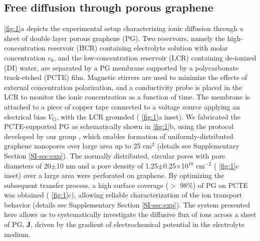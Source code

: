 \subsection{Free diffusion through porous graphene}
\label{sec:res-1}

\Fig{} \ref{fig:1}a depicts the experimental setup characterizing
ionic diffusion through a sheet of double layer porous graphene
(PG). Two reservoirs, namely the high-concentration reservoir (HCR)
containing electrolyte solution with molar concentration $c_0$, and
the low-concentration reservoir (LCR) containing de-ionized (DI)
water, are separated by a PG membrane supported by a polycarbonate
track-etched (PCTE) film. Magnetic stirrers are used to minimize the
effects of external concentration polarization, and a conductivity
probe is placed in the LCR to monitor the ionic concentration as a
function of time. The membrane is attached to a piece of copper tape
connected to a voltage source applying an electrical bias
$V_{\mathrm{G}}$, with the LCR grounded (\Fig{} \ref{fig:1}a
inset). We fabricated the PCTE-supported PG as schematically shown in
\Fig{} \ref{fig:1}b, using the protocol developed by our group
\cite{Choi_2018}, which enables formation of uniformly-distributed
graphene nanopores over large area up to 25 cm$^{2}$ (details see
Supplementary Section \ref{SI-sec:exp}). The normally distributed,
circular pores with pore diameters of 20$\pm$10 nm and a pore density
of 1.25$\pm$0.25$\times$10$^{10}$ cm$^{-2}$ (\Fig{} \ref{fig:1}c
inset) over a large area were perforated on graphene.  By optimizing
the subsequent transfer process, a high surface coverage ($>$ 98\%) of
PG on PCTE was obtained (\Fig{} \ref{fig:1}c), allowing reliable
characterization of the ion transport behavior (details see
Supplementary Section \ref{SI-sec:exp}).  The system presented here
allows us to systematically investigate the diffusive flux of ions
across a sheet of PG, $\boldsymbol{J}$, driven by the gradient of
electrochemical potential in the electrolyte medium.

